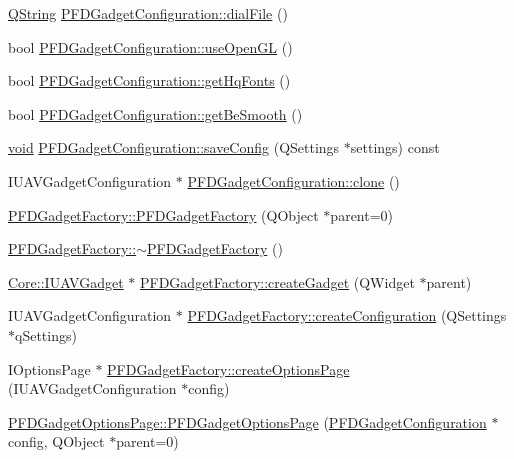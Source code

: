 \begin{DoxyCompactItemize}
\item 
\hyperlink{group___u_a_v_objects_plugin_gab9d252f49c333c94a72f97ce3105a32d}{\-Q\-String} \hyperlink{group___p_f_d_plugin_ga0c75d60343b097f8da312d96e5fa8a68}{\-P\-F\-D\-Gadget\-Configuration\-::dial\-File} ()
\item 
bool \hyperlink{group___p_f_d_plugin_ga9ee42411026741bf10767ec9bddf4f5e}{\-P\-F\-D\-Gadget\-Configuration\-::use\-Open\-G\-L} ()
\item 
bool \hyperlink{group___p_f_d_plugin_ga618cd55f8f758294cbed557e9e610eb6}{\-P\-F\-D\-Gadget\-Configuration\-::get\-Hq\-Fonts} ()
\item 
bool \hyperlink{group___p_f_d_plugin_ga50b05c372ea7566767fee660a4e811f3}{\-P\-F\-D\-Gadget\-Configuration\-::get\-Be\-Smooth} ()
\item 
\hyperlink{group___u_a_v_objects_plugin_ga444cf2ff3f0ecbe028adce838d373f5c}{void} \hyperlink{group___p_f_d_plugin_ga31f17afc274f0b137893d28f61adb4ca}{\-P\-F\-D\-Gadget\-Configuration\-::save\-Config} (\-Q\-Settings $\ast$settings) const 
\item 
\-I\-U\-A\-V\-Gadget\-Configuration $\ast$ \hyperlink{group___p_f_d_plugin_gabe4d60a242c6090fd1df05c1da47e165}{\-P\-F\-D\-Gadget\-Configuration\-::clone} ()
\item 
\hyperlink{group___p_f_d_plugin_ga3c6dc1d198abb5039a6eae8378445ce8}{\-P\-F\-D\-Gadget\-Factory\-::\-P\-F\-D\-Gadget\-Factory} (\-Q\-Object $\ast$parent=0)
\item 
\hyperlink{group___p_f_d_plugin_ga56df1b4bb10efeda677e12cab72651a1}{\-P\-F\-D\-Gadget\-Factory\-::$\sim$\-P\-F\-D\-Gadget\-Factory} ()
\item 
\hyperlink{class_core_1_1_i_u_a_v_gadget}{\-Core\-::\-I\-U\-A\-V\-Gadget} $\ast$ \hyperlink{group___p_f_d_plugin_gaabdf0c7b16f184f5e8c2ca4dd1a8b6d0}{\-P\-F\-D\-Gadget\-Factory\-::create\-Gadget} (\-Q\-Widget $\ast$parent)
\item 
\-I\-U\-A\-V\-Gadget\-Configuration $\ast$ \hyperlink{group___p_f_d_plugin_gab815256ffa03ff2447c6be5a1d56e1ab}{\-P\-F\-D\-Gadget\-Factory\-::create\-Configuration} (\-Q\-Settings $\ast$q\-Settings)
\item 
\-I\-Options\-Page $\ast$ \hyperlink{group___p_f_d_plugin_ga74a3922aa2b3e3524dc1969c65f4bf07}{\-P\-F\-D\-Gadget\-Factory\-::create\-Options\-Page} (\-I\-U\-A\-V\-Gadget\-Configuration $\ast$config)
\item 
\hyperlink{group___p_f_d_plugin_ga788662fb7f7fe425c74e222930c5234f}{\-P\-F\-D\-Gadget\-Options\-Page\-::\-P\-F\-D\-Gadget\-Options\-Page} (\hyperlink{class_p_f_d_gadget_configuration}{\-P\-F\-D\-Gadget\-Configuration} $\ast$config, \-Q\-Object $\ast$parent=0)

\end{DoxyCompactItemize}
